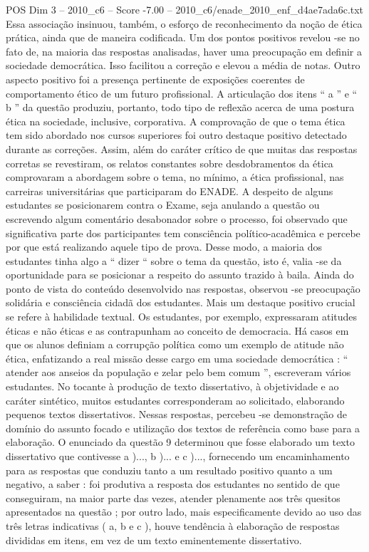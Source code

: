 \begin{textsample}{POS Dim 3 – 2010\_c6 – Score -7.00 – 2010\_c6/enade\_2010\_enf\_d4ae7ada6c.txt}
Essa associação insinuou, também, o esforço de reconhecimento da noção de ética prática, ainda que de maneira codificada.
Um dos pontos positivos revelou -se no fato de, na maioria das respostas analisadas, haver uma preocupação em definir a sociedade democrática.
Isso facilitou a correção e elevou a média de notas.
Outro aspecto positivo foi a presença pertinente de exposições coerentes de comportamento ético de um futuro profissional.
A articulação dos itens “ a ” e “ b ” da questão produziu, portanto, todo tipo de reflexão acerca de uma postura ética na sociedade, inclusive, corporativa.
A comprovação de que o tema ética tem sido abordado nos cursos superiores foi outro destaque positivo detectado durante as correções.
Assim, além do caráter crítico de que muitas das respostas corretas se revestiram, os relatos constantes sobre desdobramentos da ética comprovaram a abordagem sobre o tema, no mínimo, a ética profissional, nas carreiras universitárias que participaram do ENADE.
A despeito de alguns estudantes se posicionarem contra o Exame, seja anulando a questão ou escrevendo algum comentário desabonador sobre o processo, foi observado que significativa parte dos participantes tem consciência político-acadêmica e percebe por que está realizando aquele tipo de prova.
Desse modo, a maioria dos estudantes tinha algo a “ dizer “ sobre o tema da questão, isto é, valia -se da oportunidade para se posicionar a respeito do assunto trazido à baila.
Ainda do ponto de vista do conteúdo desenvolvido nas respostas, observou -se preocupação solidária e consciência cidadã dos estudantes.
Mais um destaque positivo crucial se refere à habilidade textual.
Os estudantes, por exemplo, expressaram atitudes éticas e não éticas e as contrapunham ao conceito de democracia.
Há casos em que os alunos definiam a corrupção política como um exemplo de atitude não ética, enfatizando a real missão desse cargo em uma sociedade democrática : “ atender aos anseios da população e zelar pelo bem comum ”, escreveram vários estudantes.
No tocante à produção de texto dissertativo, à objetividade e ao caráter sintético, muitos estudantes corresponderam ao solicitado, elaborando pequenos textos dissertativos.
Nessas respostas, percebeu -se demonstração de domínio do assunto focado e utilização dos textos de referência como base para a elaboração.
O enunciado da questão 9 determinou que fosse elaborado um texto dissertativo que contivesse a )..., b )... e c )..., fornecendo um encaminhamento para as respostas que conduziu tanto a um resultado positivo quanto a um negativo, a saber : foi produtiva a resposta dos estudantes no sentido de que conseguiram, na maior parte das vezes, atender plenamente aos três quesitos apresentados na questão ; por outro lado, mais especificamente devido ao uso das três letras indicativas ( a, b e c ), houve tendência à elaboração de respostas divididas em itens, em vez de um texto eminentemente dissertativo.

\end{textsample}
